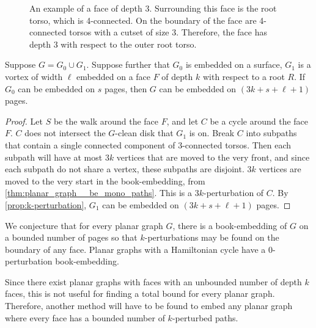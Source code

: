 \begin{figure}[h!]
	\centering
	
	\caption[Face of depth 3]{An example of a face of depth 3. Surrounding this face is the root torso, which is 4-connected. On the boundary of the face are 4-connected torsos with a cutset of size 3.  Therefore, the face has depth 3 with respect to the outer root torso.}\label{fig:face_depth}
\end{figure}

\begin{proposition}
	Suppose $G = G_0 \cup G_1$. Suppose further that $G_0$ is embedded on a surface, $G_1$ is a vortex of width $\ell$ embedded on a face $F$ of depth $k$ with respect to a root $R$. If $G_0$ can be embedded on $s$ pages, then $G$ can be embedded on $(3k + s + \ell + 1)$ pages.
\end{proposition}

\begin{proof}
	Let $S$ be the walk around the face $F$, and let $C$ be a cycle around the face $F$. $C$ does not intersect the $G$-clean disk that $G_1$ is on. Break $C$ into subpaths that contain a single connected component of $3$-connected torsos. Then each subpath will have at most $3k$ vertices that are moved to the very front, and since each subpath do not share a vertex, these subpaths are disjoint. $3k$ vertices are moved to the very start in the book-embedding, from \cref{thm:planar_graph__be_mono_paths}. This is a $3k$-perturbation of $C$. By \cref{prop:k-perturbation}, $G_1$ can be embedded on $(3k + s + \ell + 1)$ pages. 
\end{proof}
We conjecture that for every planar graph $G$, there is a book-embedding of $G$ on a bounded number of pages so that $k$-perturbations may be found on the boundary of any face. Planar graphs with a Hamiltonian cycle have a $0$-perturbation book-embedding. 

Since there exist planar graphs with faces with an unbounded number of depth $k$ faces, this is not useful for finding a total bound for every planar graph. Therefore, another method will have to be found to embed any planar graph where every face has a bounded number of $k$-perturbed paths. 
